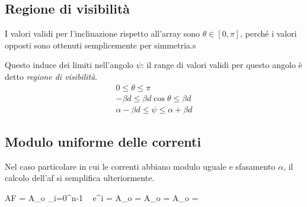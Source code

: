 	\subsection{Regione di visibilità}
		I valori validi per l'inclinazione rispetto all'array sono $\theta \in [0, \pi]$, perché i valori opposti sono ottenuti semplicemente per simmetria.s
		
		Questo induce dei limiti nell'angolo $\psi$: il range di valori validi per questo angolo è detto \emph{regione di visibilità}.
		\begin{equation} \begin{gathered}
		 0 \le \theta \le \pi \\
		 -\beta d \le \beta d \cos \theta \le \beta d \\ 
		 \alpha - \beta d \le \psi \le \alpha + \beta d 
		\end{gathered} \end{equation}

	\subsection{Modulo uniforme delle correnti}
		Nel caso particolare in cui le correnti abbiano modulo uguale e sfasamento $\alpha$, il calcolo dell'\gls{af} si semplifica ulteriormente.
			
		\begin{esp}
			AF 
				= A_o \sum_{i=0}^{n-1} ~ e^{\jmath i \psi}
				= A_o 
				= A_o 
				= A_o 
					  
				= 
				
		\end{esp}